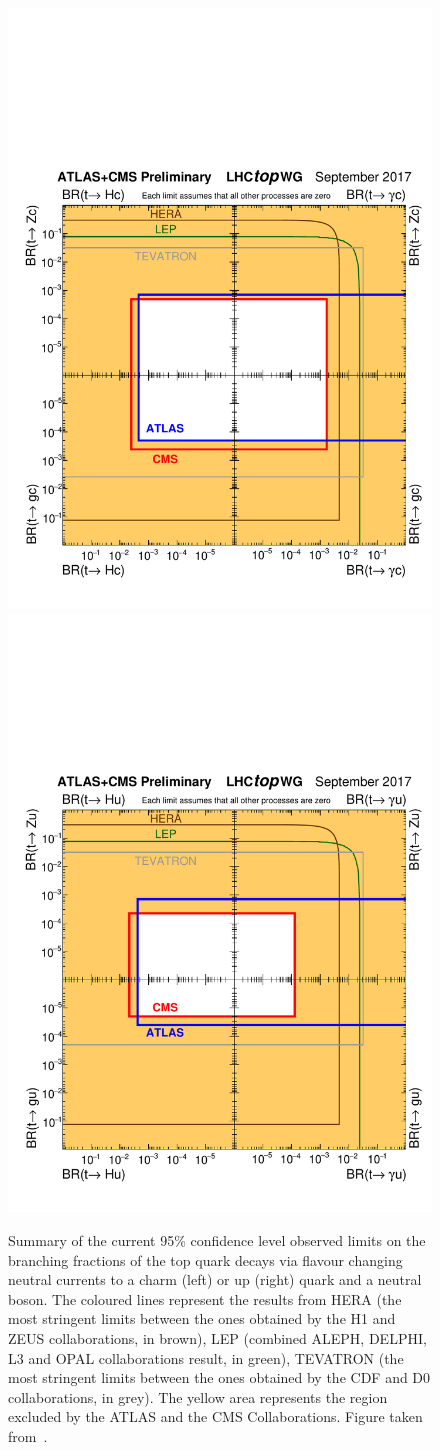 \begin{figure}[htbp]
	\centering
	\includegraphics[width=0.49\linewidth]{1_Introduction/Figures/fcnc_tXc_sep17.pdf}
	\includegraphics[width=0.49\linewidth]{1_Introduction/Figures/fcnc_tXu_sep17.pdf}
	\caption{Summary of the current 95\% confidence level observed limits on the branching fractions of the top quark decays via flavour changing neutral currents to a charm (left) or up (right) quark and a neutral boson. The coloured lines represent the results from HERA (the most stringent limits between the ones obtained by the H1 and ZEUS collaborations, in brown), LEP (combined ALEPH, DELPHI, L3 and OPAL collaborations result, in green), TEVATRON (the most stringent limits between the ones obtained by the CDF and D0 collaborations, in grey). The yellow area represents the region excluded by the ATLAS and the CMS Collaborations. Figure taken from~\cite{summarytwiki}.}
	\label{fig:FCNCATLASCMS}
\end{figure}





